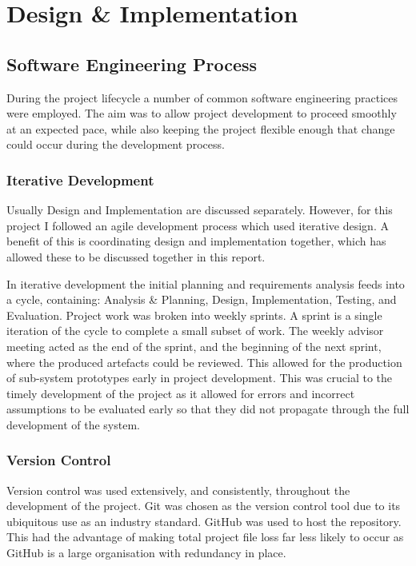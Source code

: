 \documentclass{l4proj}
\begin{document}
\chapter{Design \& Implementation}

\section{Software Engineering Process}

During the project lifecycle a number of common software engineering practices were employed. The aim was to allow project development to proceed smoothly at an expected pace, while also keeping the project flexible enough that change could occur during the development process.

\subsection{Iterative Development}

Usually Design and Implementation are discussed separately. However, for this project I followed an agile development process which used iterative design. A benefit of this is coordinating design and implementation together, which has allowed these to be discussed together in this report.

In iterative development the initial planning and requirements analysis feeds into a cycle, containing: Analysis \& Planning, Design, Implementation, Testing, and Evaluation. Project work was broken into weekly sprints. A sprint is a single iteration of the cycle to complete a small subset of work. The weekly advisor meeting acted as the end of the sprint, and the beginning of the next sprint, where the produced artefacts could be reviewed. This allowed for the production of sub-system prototypes early in project development. This was crucial to the timely development of the project as it allowed for errors and incorrect assumptions to be evaluated early so that they did not propagate through the full development of the system.

\subsection{Version Control}

Version control was used extensively, and consistently, throughout the development of the project. Git was chosen as the version control tool due to its ubiquitous use as an industry standard. GitHub was used to host the repository. This had the advantage of making total project file loss far less likely to occur as GitHub is a large organisation with redundancy in place.
\end{document}
